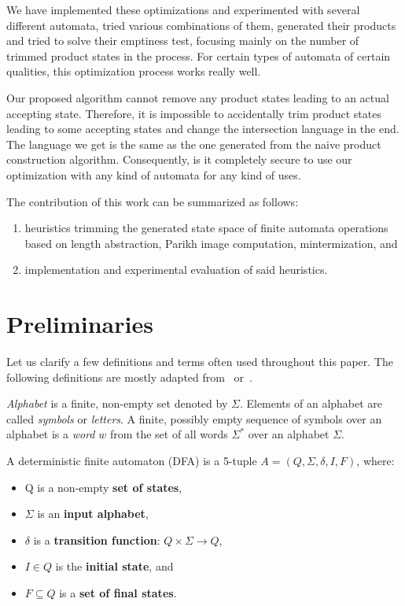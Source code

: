 We have implemented these optimizations and experimented with several different automata, tried various combinations of them, generated their products and tried to solve their emptiness test, focusing mainly on the number of trimmed product states in the process. For certain types of automata of certain qualities, this optimization process works really well.

Our proposed algorithm cannot remove any product states leading to an actual accepting state. Therefore, it is impossible to accidentally trim product states leading to some accepting states and change the intersection language in the end. The language we get is the same as the one generated from the naive product construction algorithm. Consequently, is it completely secure to use our optimization with any kind of automata for any kind of uses.

The contribution of this work can be summarized as follows:
\begin{enumerate}
    \item heuristics trimming the generated state space of finite automata operations based on length abstraction, Parikh image computation, mintermization, and
    \item implementation and experimental evaluation of said heuristics.
\end{enumerate}


\chapter{Preliminaries}
Let us clarify a few definitions and terms often used throughout this paper. The following definitions are mostly adapted from~\cite{Esparza} or~\cite{Sipser}.

\emph{Alphabet} is a finite, non-empty set denoted by $\Sigma$. Elements of an alphabet are called \emph{symbols} or \emph{letters}. A finite, possibly empty sequence of symbols over an alphabet is a \emph{word} $w$ from the set of all words $\Sigma^*$ over an alphabet $\Sigma$.

\begin{definition} \hfill \newline
    A deterministic finite automaton (DFA) is a 5-tuple $A = (Q, \Sigma, \delta, I, F)$, where:
    \begin{itemize}
        \item Q is a non-empty \textbf{set of states},
        \item $\Sigma$ is an \textbf{input alphabet},
        \item $\delta$ is a \textbf{transition function}: $Q \times \Sigma \rightarrow{} Q$,
        \item $I \in Q$ is the \textbf{initial state}, and
        \item $F \subseteq Q$ is a \textbf{set of final states}.
    \end{itemize}
\end{definition}

